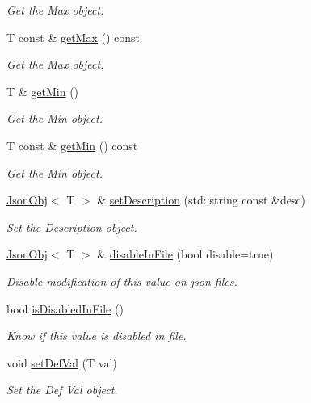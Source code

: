 \begin{DoxyCompactItemize}
\begin{DoxyCompactList}\small\item\em Get the Max object. \end{DoxyCompactList}\item 
T const  \& \hyperlink{class_json_obj_af60a04f6565471c8a054698034ac5045}{get\+Max} () const
\begin{DoxyCompactList}\small\item\em Get the Max object. \end{DoxyCompactList}\item 
T \& \hyperlink{class_json_obj_a789404a7efe25c04646152502efb6eff}{get\+Min} ()
\begin{DoxyCompactList}\small\item\em Get the Min object. \end{DoxyCompactList}\item 
T const  \& \hyperlink{class_json_obj_a6152503545a3085438ffbac09a98e67c}{get\+Min} () const
\begin{DoxyCompactList}\small\item\em Get the Min object. \end{DoxyCompactList}\item 
\hyperlink{class_json_obj}{Json\+Obj}$<$ T $>$ \& \hyperlink{class_json_obj_a8270b9c91a8ec2d1887cec74dbde9a30}{set\+Description} (std\+::string const \&desc)
\begin{DoxyCompactList}\small\item\em Set the Description object. \end{DoxyCompactList}\item 
\hyperlink{class_json_obj}{Json\+Obj}$<$ T $>$ \& \hyperlink{class_json_obj_a52dcca1a1778122b6e7cb11c5a93b530}{disable\+In\+File} (bool disable=true)
\begin{DoxyCompactList}\small\item\em Disable modification of this value on json files. \end{DoxyCompactList}\item 
bool \hyperlink{class_json_obj_a4c549fb187f09fb3a0b43275f0b911bf}{is\+Disabled\+In\+File} ()
\begin{DoxyCompactList}\small\item\em Know if this value is disabled in file. \end{DoxyCompactList}\item 
void \hyperlink{class_json_obj_aff6a1003a4df81f1f006ec7fce81e1be}{set\+Def\+Val} (T val)
\begin{DoxyCompactList}\small\item\em Set the Def Val object. \end{DoxyCompactList}\item 

\end{DoxyCompactItemize}
